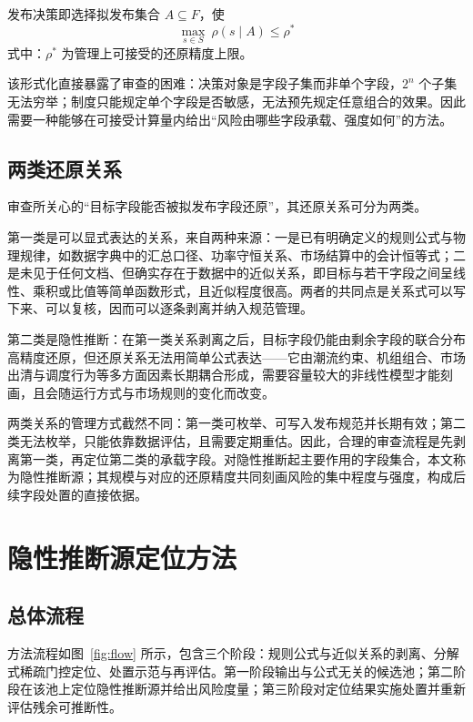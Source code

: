 \documentclass[UTF8,zihao=5,twoside]{ctexart}
\begin{document}
发布决策即选择拟发布集合 $A\subseteq F$，使
\begin{equation}
\max_{s\in S}\ \rho(s\mid A)\le \rho^{\ast}
\end{equation}
式中：$\rho^{\ast}$ 为管理上可接受的还原精度上限。

该形式化直接暴露了审查的困难：决策对象是字段子集而非单个字段，$2^n$ 个子集无法穷举；制度只能规定单个字段是否敏感，无法预先规定任意组合的效果。因此需要一种能够在可接受计算量内给出“风险由哪些字段承载、强度如何”的方法。

\subsection{两类还原关系}

审查所关心的“目标字段能否被拟发布字段还原”，其还原关系可分为两类。

第一类是可以显式表达的关系，来自两种来源：一是已有明确定义的规则公式与物理规律，如数据字典中的汇总口径、功率守恒关系、市场结算中的会计恒等式；二是未见于任何文档、但确实存在于数据中的近似关系，即目标与若干字段之间呈线性、乘积或比值等简单函数形式，且近似程度很高。两者的共同点是关系式可以写下来、可以复核，因而可以逐条剥离并纳入规范管理。

第二类是隐性推断：在第一类关系剥离之后，目标字段仍能由剩余字段的联合分布高精度还原，但还原关系无法用简单公式表达——它由潮流约束、机组组合、市场出清与调度行为等多方面因素长期耦合形成，需要容量较大的非线性模型才能刻画，且会随运行方式与市场规则的变化而改变。

两类关系的管理方式截然不同：第一类可枚举、可写入发布规范并长期有效；第二类无法枚举，只能依靠数据评估，且需要定期重估。因此，合理的审查流程是先剥离第一类，再定位第二类的承载字段。对隐性推断起主要作用的字段集合，本文称为隐性推断源；其规模与对应的还原精度共同刻画风险的集中程度与强度，构成后续字段处置的直接依据。

\section{隐性推断源定位方法}

\subsection{总体流程}

方法流程如图~\ref{fig:flow} 所示，包含三个阶段：规则公式与近似关系的剥离、分解式稀疏门控定位、处置示范与再评估。第一阶段输出与公式无关的候选池；第二阶段在该池上定位隐性推断源并给出风险度量；第三阶段对定位结果实施处置并重新评估残余可推断性。
\end{document}
